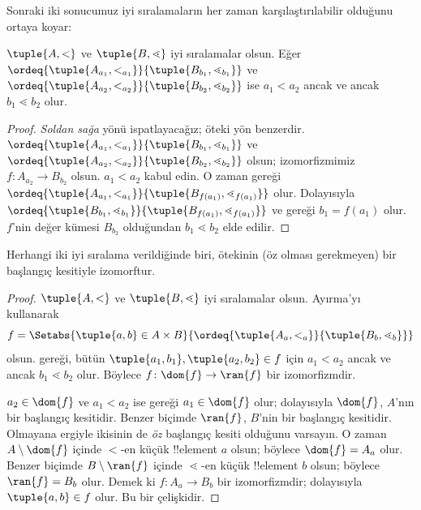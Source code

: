 Sonraki iki sonucumuz iyi sıralamaların her zaman karşılaştırılabilir
olduğunu ortaya koyar:

\begin{lem}
$\tuple{A,<}$ ve $\tuple{B,\lessdot}$ iyi sıralamalar olsun. Eğer
$\ordeq{\tuple{A_{a_1},<_{a_1}}}{\tuple{B_{b_1},\lessdot_{b_1}}}$ ve
$\ordeq{\tuple{A_{{a_2}},<_{a_2}}}{\tuple{B_{{b_2}},
\lessdot_{b_2}}}$ ise ${a_1}<{a_2}$ ancak ve ancak
${b_1}\lessdot{b_2}$ olur.
\end{lem}

\begin{proof}
\emph{Soldan sağa} yönü ispatlayacağız; öteki yön benzerdir.
$\ordeq{\tuple{A_{a_1},<_{a_1}}}{\tuple{B_{b_1},\lessdot_{b_1}}}$ ve
$\ordeq{\tuple{A_{{a_2}},<_{a_2}}}{\tuple{B_{{b_2}},\lessdot_{b_2}}}$
olsun; izomorfizmimiz $f\colon A_{{a_2}}\to B_{{b_2}}$ olsun.
${a_1}<{a_2}$ kabul edin. O zaman
 gereği
$\ordeq{\tuple{A_{a_1},<_{a_1}}}{\tuple{B_{f({a_1})},
\lessdot_{f({a_1})}}}$ olur. Dolayısıyla
$\ordeq{\tuple{B_{b_1},\lessdot_{b_1}}}{\tuple{B_{f({a_1})},
\lessdot_{f({a_1})}}}$ ve  gereği
${b_1}=f({a_1})$ olur. $f$'nin değer kümesi $B_{{b_2}}$ olduğundan
${b_1}\lessdot{b_2}$ elde edilir.
\end{proof}

\begin{thm}
Herhangi iki iyi sıralama verildiğinde biri, ötekinin (öz olması gerekmeyen)
bir başlangıç kesitiyle izomorftur.
\end{thm}

\begin{proof}
$\tuple{A,<}$ ve $\tuple{B,\lessdot}$ iyi sıralamalar olsun. Ayırma'yı
kullanarak
\[
	f = \Setabs{\tuple{a, b} \in A \times B}{
		\ordeq{\tuple{A_a, <_a}}{\tuple{B_b, \lessdot_b}}}
\]
olsun.  gereği, bütün
$\tuple{a_1,b_1},\tuple{a_2,b_2}\in f$ için $a_1<a_2$ ancak ve ancak
$b_1\lessdot b_2$ olur. Böylece
$f\colon\dom{f}\to\ran{f}$ bir izomorfizmdir.

$a_2\in\dom{f}$ ve $a_1<a_2$ ise
 gereği $a_1\in\dom{f}$ olur; dolayısıyla
$\dom{f}$, $A$'nın bir başlangıç kesitidir. Benzer biçimde $\ran{f}$,
$B$'nin bir başlangıç kesitidir. Olmayana ergiyle ikisinin de \emph{öz}
başlangıç kesiti olduğunu varsayın. O zaman $A\setminus\dom{f}$ içinde
$<$-en küçük !!{element} $a$ olsun; böylece $\dom{f}=A_a$ olur. Benzer
biçimde $B\setminus\ran{f}$ içinde $\lessdot$-en küçük !!{element} $b$
olsun; böylece $\ran{f}=B_b$ olur. Demek ki
$f\colon A_a\to B_b$ bir izomorfizmdir; dolayısıyla
$\tuple{a,b}\in f$ olur. Bu bir çelişkidir.
\end{proof}

